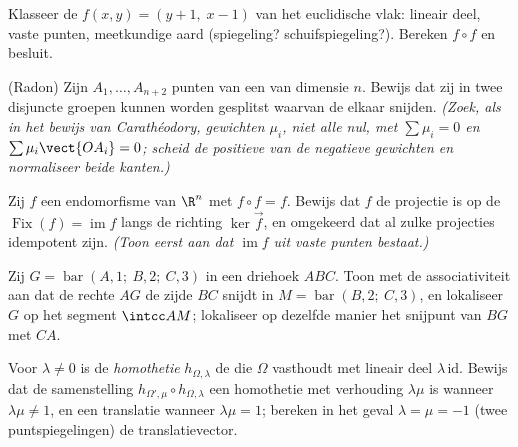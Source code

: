 \begin{exercise}[$\star\star$]\label{exo:b2:affine:6}
Klasseer de  $f(x, y) = (y + 1,\; x - 1)$ van het
euclidische vlak: lineair deel, vaste punten, meetkundige aard
(spiegeling? schuifspiegeling?). Bereken $f \circ f$ en besluit.
\end{exercise}

\begin{exercise}[$\star\star\star$]\label{exo:b2:affine:7}
(Radon) Zijn $A_1, \dots, A_{n+2}$ punten van een 
van dimensie $n$. Bewijs dat zij in twee disjuncte groepen kunnen
worden gesplitst waarvan de  elkaar snijden.
\emph{(Zoek, als in het bewijs van Carathéodory, gewichten $\mu_i$,
niet alle nul, met $\sum\mu_i = 0$ en $\sum\mu_i\vect{OA_i} = 0$;
scheid de positieve van de negatieve gewichten en normaliseer beide
kanten.)}
\end{exercise}

\begin{exercise}[$\star\star\star$]\label{exo:b2:affine:8}
Zij $f$ een  endomorfisme van $\R^n$ met $f \circ f = f$.
Bewijs dat $f$ de  projectie is op de 
$\operatorname{Fix}(f) = \operatorname{im} f$ langs de richting
$\ker\vec f$, en omgekeerd dat al zulke projecties idempotent zijn.
\emph{(Toon eerst aan dat $\operatorname{im} f$ uit vaste punten
bestaat.)}
\end{exercise}

\begin{exercise}[$\star$]\label{exo:b2:affine:9}
Zij $G = \operatorname{bar}(A, 1;\ B, 2;\ C, 3)$ in een driehoek
$ABC$. Toon met de associativiteit aan dat de rechte $AG$ de zijde
$BC$ snijdt in $M = \operatorname{bar}(B, 2;\ C, 3)$, en lokaliseer
$G$ op het segment $\intcc AM$; lokaliseer op dezelfde manier het
snijpunt van $BG$ met $CA$.
\end{exercise}

\begin{exercise}[$\star\star$]\label{exo:b2:affine:10}
Voor $\lambda \neq 0$ is de \emph{homothetie} $h_{\Omega, \lambda}$
de  die $\Omega$ vasthoudt met lineair deel
$\lambda\,\mathrm{id}$. Bewijs dat de samenstelling $h_{\Omega',
\mu} \circ h_{\Omega, \lambda}$ een homothetie met verhouding
$\lambda\mu$ is wanneer $\lambda\mu \neq 1$, en een translatie
wanneer $\lambda\mu = 1$; bereken in het geval $\lambda = \mu = -1$
(twee puntspiegelingen) de translatievector.
\end{exercise}

